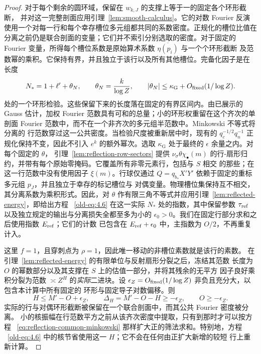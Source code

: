 \documentclass[11pt,a4paper]{article}
\numberwithin{equation}{section}
\numberwithin{figure}{section}
\theoremstyle{definition}
\theoremstyle{remark}
\begin{document}
\begin{proof}
对于每个剩余的圆环域，保留在 $w_{k,J}$ 的支撑上等于一的固定各个环形截断，
并对这一完整剖面应用引理~\ref{lem:smooth-calculus}。它的对数 Fourier 反演
使用一个对每一行和每个幸存槽位多元组都共同的系数密度。正规化的槽位比值在
分离之前仍是联合剖面的变量；它们并不索引分别选取的密度。对于固定的 Fourier
变量，所得每个槽位系数是原始算术系数 $\overline{\eta(p_i)}$ 与一个个环形截断
及范数幂的乘积。它保持有界，并且独立于该行以及所有其他槽位。完备化因子是在
长度
\[
 N_*=1+\ell'+\theta_N,\qquad
 \theta_N=\frac{k}{\log Z},\qquad
 |\theta_N|\le\kappa_{\mathrm G}+O_{\rm fixed}(1/\log Z).
\]
处的一个环形检验。这些保留下来的长度落在固定的有界区间内。由已展示的 Gauss
估计，加权 Fourier 范数具有可和的总量；小的环形权重留在这个齐次的单剖面
Fourier 范数中，而不在一个非齐次的多元组半范数中。Minkowski 不等式将分离的
行范数穿过这一公共密度。当检验尺度被重新居中时，现有的
$q_c^{-1/2}q_n^{-1}$ 正规化保持不变，因此不引入 $e^k$ 的额外幂次。选取
$\kappa_{\mathrm G}$ 处于最终的 $\epsilon$ 余量之内。对每个固定的 $\theta$，
引理~\ref{lem:reflection-row-sectors} 提供 $\nu_\sigma\theta\chi_\bullet(m)$
的行-扇形归约，并带有每个原始零掩码。它覆盖所有非零元素行，包括与 $S$ 相交
的那些；在这一行范数中没有使用因子 $\xi(m)$。行球仅通过
$Q=q_{b_*}X'Y'$ 依赖于固定的重标多元组 $p_J$，并且独立于幸存的标记槽位与
对偶变量。物理槽位集保持互不相交，其分离系数为乘积形式。因此，对 $\theta$
作有限三角不等式并应用引理~\ref{lem:reflected-energy}，即给出方程
~\eqref{old-eq:4.6} 在这一实际 $N_*$ 处的指数，其中保留参数
$\tau_{\rm ref}$ 以及独立规定的输出与分离损失全都至多为小的
$\epsilon_0>0$。我们在固定行部分求和之后使用指数 $E_{\rm ref}$；它们的计数
已包含在 $E_{\rm ref}+\epsilon_0$ 中，主指数为 $O/2$，不再重复计入。

这里 $f=1$，且穿刺点为 $\rho=1$，因此唯一移动的非槽位素数就是该行的素数。
在引理~\ref{lem:reflected-energy} 的有限单位与反射扇形分裂之后，冻结其范数
长度为 $O$ 的幂数部分以及其支撑在 $S$ 上的估值一部分，并将其残余的无平方
因子良好乘积分裂为范数 $\asymp Z^H$ 的\emph{实际}二进块。设
$\epsilon_Z=O_{\rm fixed}(1/\log Z)$ 非负且充分大，以包含本计算中所有固定的
环形与固定导子对数偏移。则
\[
 H\le M'-O+\epsilon_Z,\qquad
 \Delta_H=M'-O-H\ge-\epsilon_Z,\qquad O\ge-\epsilon_Z.
\]
实际的行与对偶环形截断被保留在一个联合剖面中，而其公共 Fourier 密度被分离。
小的核振幅在行范数平方之前从该齐次密度中提取，只有到那时才可以按方程
~\eqref{eq:reflection-common-minkowski} 那样扩大正的筛法求和。特别地，方程
~\eqref{old-eq:4.6} 中的核节省使用这一 $H$；它不会在任何由正扩大新增的较短
行上重新计算。


\end{proof}
\end{document}
